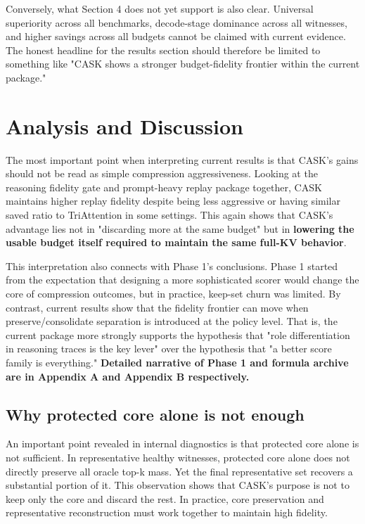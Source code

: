 Conversely, what Section 4 does not yet support is also clear. Universal superiority across all benchmarks, decode-stage dominance across all witnesses, and higher savings across all budgets cannot be claimed with current evidence. The honest headline for the results section should therefore be limited to something like "CASK shows a stronger budget-fidelity frontier within the current package."


\section{Analysis and Discussion}


The most important point when interpreting current results is that CASK's gains should not be read as simple compression aggressiveness. Looking at the reasoning fidelity gate and prompt-heavy replay package together, CASK maintains higher replay fidelity despite being less aggressive or having similar saved ratio to TriAttention in some settings. This again shows that CASK's advantage lies not in "discarding more at the same budget" but in \textbf{lowering the usable budget itself required to maintain the same full-KV behavior}.


This interpretation also connects with Phase 1's conclusions. Phase 1 started from the expectation that designing a more sophisticated scorer would change the core of compression outcomes, but in practice, keep-set churn was limited. By contrast, current results show that the fidelity frontier can move when preserve/consolidate separation is introduced at the policy level. That is, the current package more strongly supports the hypothesis that "role differentiation in reasoning traces is the key lever" over the hypothesis that "a better score family is everything." \textbf{Detailed narrative of Phase 1 and formula archive are in Appendix A and Appendix B respectively.}


\subsection{Why protected core alone is not enough}


An important point revealed in internal diagnostics is that protected core alone is not sufficient. In representative healthy witnesses, protected core alone does not directly preserve all oracle top-k mass. Yet the final representative set recovers a substantial portion of it. This observation shows that CASK's purpose is not to keep only the core and discard the rest. In practice, core preservation and representative reconstruction must work together to maintain high fidelity.

